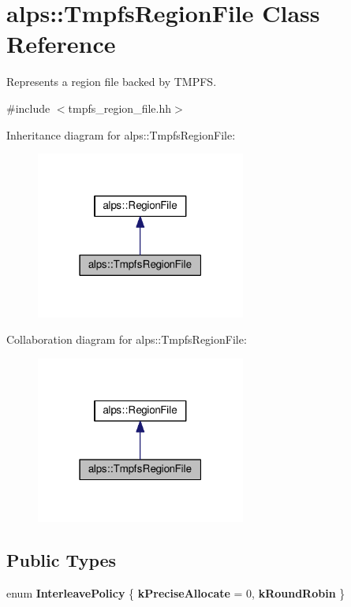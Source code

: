 \hypertarget{classalps_1_1TmpfsRegionFile}{}\section{alps\+:\+:Tmpfs\+Region\+File Class Reference}
\label{classalps_1_1TmpfsRegionFile}


Represents a region file backed by T\+M\+P\+FS.  




{\ttfamily \#include $<$tmpfs\+\_\+region\+\_\+file.\+hh$>$}



Inheritance diagram for alps\+:\+:Tmpfs\+Region\+File\+:
\nopagebreak
\begin{figure}[H]
\begin{center}
\leavevmode
\includegraphics[width=195pt]{classalps_1_1TmpfsRegionFile__inherit__graph}
\end{center}
\end{figure}


Collaboration diagram for alps\+:\+:Tmpfs\+Region\+File\+:
\nopagebreak
\begin{figure}[H]
\begin{center}
\leavevmode
\includegraphics[width=195pt]{classalps_1_1TmpfsRegionFile__coll__graph}
\end{center}
\end{figure}
\subsection*{Public Types}
\begin{DoxyCompactItemize}
\item 
enum {\bfseries Interleave\+Policy} \{ {\bfseries k\+Precise\+Allocate} = 0, 
{\bfseries k\+Round\+Robin}
 \}\hypertarget{classalps_1_1TmpfsRegionFile_a4c77cd5eea6561a439c3e0507428864a}{}\label{classalps_1_1TmpfsRegionFile_a4c77cd5eea6561a439c3e0507428864a}

\end{DoxyCompactItemize}
